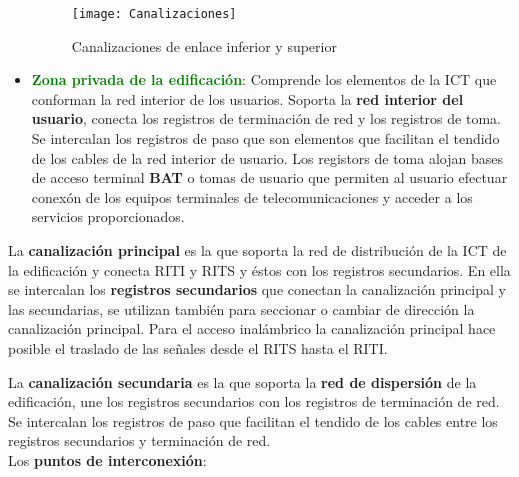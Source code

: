 \documentclass[10pt,portrait, twocolumn]{article}
\begin{document}
\begin{itemize}
			\begin{figure}[h]
	\centering
     \texttt{[image: Canalizaciones]}
      \caption{Canalizaciones de enlace inferior y superior}
      \label{fig:ONT}
  \end{figure}

		
		\item \textbf{\textcolor{green}{Zona privada de la edificación}}: Comprende los elementos de la ICT que conforman la red interior de los usuarios. Soporta la \textbf{red interior del usuario}, conecta los registros de terminación de red y los registros de toma. Se intercalan los registros de paso que son elementos que facilitan el tendido de los cables de la red interior de usuario. Los registors de toma alojan bases de acceso terminal \textbf{BAT} o tomas de usuario que permiten al usuario efectuar conexón de los equipos terminales de telecomunicaciones y acceder a los servicios proporcionados.
	\end{itemize}


La \textbf{canalización principal} es la que soporta la red de distribución de la ICT de la edificación y conecta RITI y RITS y éstos con los registros secundarios. En ella se intercalan los \textbf{registros secundarios} que conectan la canalización principal y las secundarias, se utilizan también para seccionar o cambiar de dirección la canalización principal.  Para el acceso inalámbrico la canalización principal hace posible el traslado de las señales desde el RITS hasta el RITI.

\quad La \textbf{canalización secundaria} es la que soporta la \textbf{red de dispersión} de la edificación, une los registros secundarios con los registros de terminación de red. Se intercalan los registros de paso que facilitan el tendido de los cables entre los registros secundarios y terminación de red.\\

Los \textbf{puntos de interconexión}:
\end{document}
